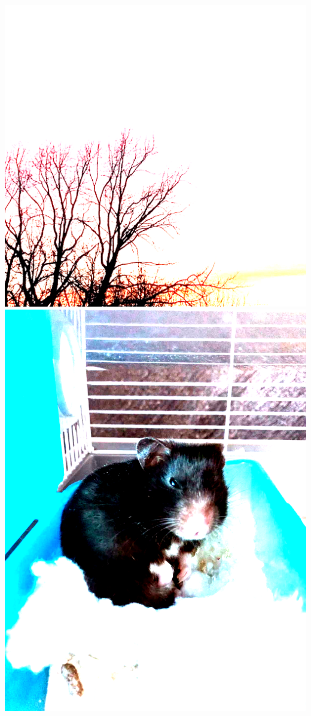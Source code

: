 \documentclass{article}
\begin{document}
\includegraphics[totalheight = 4cm]{222.png} \hspace{1.5cm}
\includegraphics[totalheight = 4cm]{322.png} \\
\end{document}

